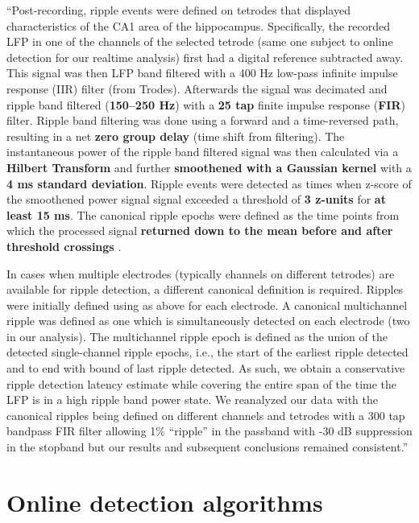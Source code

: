 \begin{quotebar}
``Post-recording, ripple events were defined on tetrodes that displayed characteristics of the CA1 area of the hippocampus. Specifically, the recorded LFP in one of the channels of the selected tetrode (same one subject to online detection for our realtime analysis) first had a digital reference subtracted away. This signal was then LFP band filtered with a 400 Hz low-pass infinite impulse response (IIR) filter (from Trodes). Afterwards the signal was decimated and ripple band filtered (\textbf{150–250 Hz}) with a \textbf{25 tap} finite impulse response (\textbf{FIR}) filter. Ripple band filtering was done using a forward and a time-reversed path, resulting in a net \textbf{zero group delay} (time shift from filtering). The instantaneous power of the ripple band filtered signal was then calculated via a \textbf{Hilbert Transform} and further \textbf{smoothened with a Gaussian kernel} with a \textbf{4 ms standard deviation}. Ripple events were detected as times when z-score of the smoothened power signal signal exceeded a threshold of \textbf{3 z-units} for \textbf{at least 15 ms}. The canonical ripple epochs were defined as the time points from which the processed signal \textbf{returned down to the mean before and after threshold crossings} \cite{Cheng2008,Kemere2013}.

In cases when multiple electrodes (typically channels on different tetrodes) are available for ripple detection, a different canonical definition is required. Ripples were initially defined using as above for each electrode. A canonical multichannel ripple was defined as one which is simultaneously detected on each electrode (two in our analysis). The multichannel ripple epoch is defined as the union of the detected single-channel ripple epochs, i.e., the start of the earliest ripple detected and to end with bound of last ripple detected. As such, we obtain a conservative ripple detection latency estimate while covering the entire span of the time the LFP is in a high ripple band power state. We reanalyzed our data with the canonical ripples being defined on different channels and tetrodes with a 300 tap bandpass FIR filter allowing 1\% “ripple” in the passband with -30 dB suppression in the stopband but our results and subsequent conclusions remained consistent.'' \cite{Dutta2018}
\end{quotebar}





\clearpage
\section{Online detection algorithms}
\label{apx:online-detection-algos}


